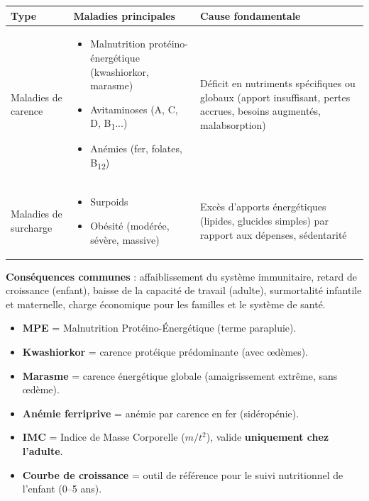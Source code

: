 \documentclass[11pt]{article}
\begin{document}
\begin{propriete}
\begin{center}
\begin{tabularx}{\linewidth}{|l|X|X|}
\hline
\rowcolor{popblueL} \textbf{Type} & \textbf{Maladies principales} & \textbf{Cause fondamentale} \\
\hline
Maladies de carence & \begin{itemize}\item Malnutrition protéino-énergétique (kwashiorkor, marasme)\item Avitaminoses (A, C, D, B\textsubscript{1}...)\item Anémies (fer, folates, B\textsubscript{12})\end{itemize} & Déficit en nutriments spécifiques ou globaux (apport insuffisant, pertes accrues, besoins augmentés, malabsorption) \\
\hline
Maladies de surcharge & \begin{itemize}\item Surpoids\item Obésité (modérée, sévère, massive)\end{itemize} & Excès d'apports énergétiques (lipides, glucides simples) par rapport aux dépenses, sédentarité \\
\hline
\end{tabularx}
\end{center}
\textbf{Conséquences communes} : affaiblissement du système immunitaire, retard de croissance (enfant), baisse de la capacité de travail (adulte), surmortalité infantile et maternelle, charge économique pour les familles et le système de santé.
\end{propriete}

\begin{aretenir}
\begin{itemize}
\item \textbf{MPE} = Malnutrition Protéino-Énergétique (terme parapluie).
\item \textbf{Kwashiorkor} = carence protéique prédominante (avec œdèmes).
\item \textbf{Marasme} = carence énergétique globale (amaigrissement extrême, sans œdème).
\item \textbf{Anémie ferriprive} = anémie par carence en fer (sidéropénie).
\item \textbf{IMC} = Indice de Masse Corporelle ($m/t^2$), valide \textbf{uniquement chez l'adulte}.
\item \textbf{Courbe de croissance} = outil de référence pour le suivi nutritionnel de l'enfant (0--5 ans).
\end{itemize}
\end{aretenir}
\end{document}
